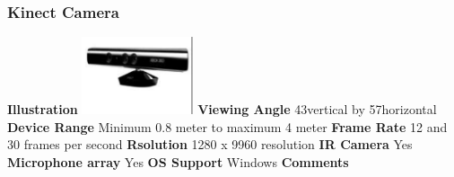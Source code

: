\documentclass[a4paper,10pt]{report}
\begin{document}
  \subsubsection{Kinect Camera}
  \textbf{Illustration}\newline
  \includegraphics{./kinect.png}
\newline
  \textbf{Viewing Angle} 43\textdegree vertical by 57\textdegree horizontal\newline
  \textbf{Device Range} Minimum 0.8 meter to maximum 4 meter\newline
  \textbf{Frame Rate} 12 and 30 frames per second\newline
  \textbf{Rsolution} 1280 x 9960 resolution \newline
  \textbf{IR Camera} Yes\newline
  \textbf{Microphone array} Yes\newline
  \textbf{OS Support} Windows\newline
  \textbf{Comments}
\end{document}
